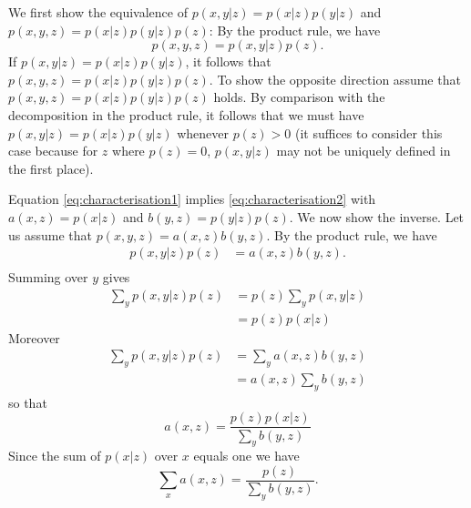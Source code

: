 \begin{solution}
  We first show the equivalence of  $p(x,y | z) =p(x | z) p(y| z)$ and
  $p(x,y,z) = p(x|z) p(y|z) p(z)$: By the product rule, we have
  $$p(x,y,z) = p(x,y|z) p(z).$$ If $p(x,y | z) =p(x | z) p(y| z)$, it
  follows that $p(x,y,z) = p(x|z) p(y|z) p(z)$. To show the opposite
  direction assume that $p(x,y,z) = p(x|z) p(y|z) p(z)$ holds. By
  comparison with the decomposition in the product rule, it follows
  that we must have $p(x,y | z) = p(x | z) p(y| z)$ whenever $p(z)>0$
  (it suffices to consider this case because for $z$ where $p(z)=0$, $p(x,y | z)$ may not be
  uniquely defined in the first place).

  Equation \eqref{eq:characterisation1} implies
  \eqref{eq:characterisation2} with $a(x,z) = p(x | z)$ and $b(y,z) =
  p(y| z)p(z)$. We now show the inverse. Let us assume that $p(x,y,z)
  = a(x,z) b(y,z)$. By the product rule, we have
  \begin{align}
    p(x,y | z)p(z) & = a(x,z) b(y,z).\\
  \end{align}
  Summing over $y$ gives
  \begin{align}
    \sum_y  p(x,y | z)p(z) & = p(z) \sum_y p(x,y | z)\\
    & = p(z) p(x|z)
  \end{align}
  Moreover
  \begin{align}
     \sum_y  p(x,y | z)p(z) & = \sum_y  a(x,z) b(y,z)\\
    & = a(x,z) \sum_y b(y,z)
  \end{align}
  so that 
  \begin{equation}
    a(x,z) = \frac{p(z) p(x | z)}{\sum_y b(y,z)}
    \label{eq:a}
  \end{equation}
  Since the sum of $p(x | z)$ over $x$ equals one we have
  \begin{equation}
    \sum_x a(x,z) = \frac{p(z)}{\sum_y b(y,z)}.
    \label{eq:asum}
  \end{equation}
  

\end{solution}
